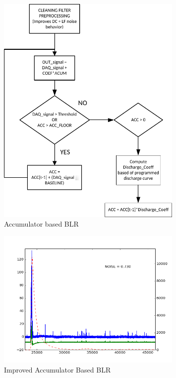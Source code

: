 \documentclass[a4paper,11pt]{report}
\begin{document}
 \begin{figure}
  \begin{center}
    \includegraphics[width=0.8\textwidth]{./figures/BLR_acc_algo.pdf}
    \caption{Accumulator based BLR}
    \label{fig:BLR_acc_algo}
  \end{center}
\end{figure}


\begin{figure}
  \begin{center}
    \includegraphics[width=0.8\textwidth]{./figures/BLR_error_acum.png}
    \caption{Improved Accumulator Based BLR}
    \label{fig:BLR_error_acum}
  \end{center}
\end{figure}
\end{document}
